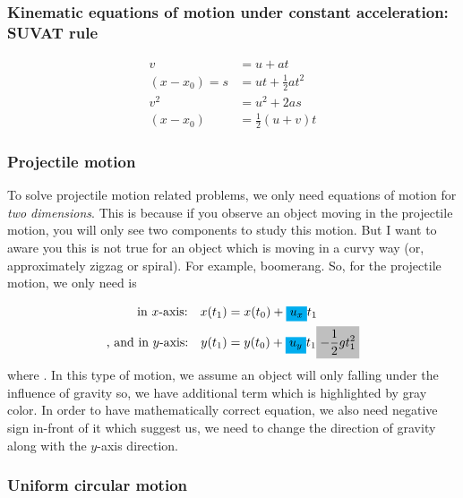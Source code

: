 \subsubsection*{Kinematic equations of motion under constant acceleration: SUVAT rule}
\begin{align}
v &= u + at\\
(x - x_{0}) = s &= ut + \frac{1}{2}at^{2} \\
v^{2} &= u^{2} + 2as \\
(x - x_{0}) &= \frac{1}{2}(u + v)t 
\end{align}

\subsubsection{Projectile motion}

To solve projectile motion related problems, we only need equations of motion for \emph{two dimensions}. This is because if you observe an object moving in the projectile motion, you will only see two components to study this motion. But I want to aware you this is not true for an object which is moving in a curvy way (or, approximately zigzag or spiral). For example, boomerang. So, for the projectile motion, we only need is

\begin{align*}
\text{in $x$-axis:\quad} x(t_{1}) &= x(t_{0}) + \mathcolorbox{cyan}{u_{x}}t_{1} \\
\text{, and in $y$-axis:\quad} y(t_{1}) &= y(t_{0}) + \mathcolorbox{cyan}{u_{y}}t_{1} \mathcolorbox{lightgray}{ - \frac{1}{2}g t^{2}_{1}}
\end{align*}
where . In this type of motion, we assume an object will only falling under the influence of gravity so, we have additional term which is highlighted by gray color. In order to have mathematically correct equation, we also need negative sign in-front of it which suggest us, we need to change the direction of gravity along with the $y$-axis direction. 

\subsubsection{Uniform circular motion}

